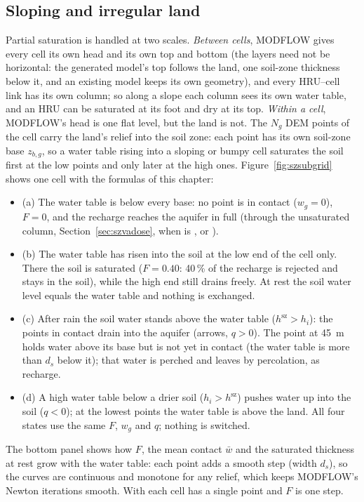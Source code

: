 \subsection{Sloping and irregular land}\label{sec:szslope}
Partial saturation is handled at two scales. \emph{Between cells}, MODFLOW gives every cell its own head and its own
top and bottom (the layers need not be horizontal: the generated model's top follows the land, one soil-zone thickness below it, and an existing model
keeps its own geometry), and every HRU--cell link has its own column; so along a slope each column sees its own water
table, and an HRU can be saturated at its foot and dry at its top. \emph{Within a cell}, MODFLOW's head is one flat
level, but the land is not. The $N_g$ DEM points of the cell carry the land's relief into the soil zone: each point has its
own soil-zone base $z_{b,g}$, so a water table rising into a sloping or bumpy cell saturates the soil first at the low
points and only later at the high ones. Figure~\ref{fig:szsubgrid} shows one cell with the formulas of this chapter:
\begin{itemize}
\item (a) The water table is below every base: no point is in contact ($w_g=0$), $F=0$, and the recharge reaches the
aquifer in full (through the unsaturated column, Section~\ref{sec:szvadose}, when  is ,  or ).
\item (b) The water table has risen into the soil at the low end of the cell only. There the soil is saturated
($F=0.40$: 40\,\% of the recharge is rejected and stays in the soil), while the high end still drains freely. At rest the
soil water level equals the water table and nothing is exchanged.
\item (c) After rain the soil water stands above the water table ($h^{\mathrm{sz}}>h_i$): the points in contact drain into the aquifer
(arrows, $q>0$). The point at 45~m holds water above its base but is not yet in contact (the water table is more than
$d_s$ below it); that water is perched and leaves by percolation, as recharge.
\item (d) A high water table below a drier soil ($h_i>h^{\mathrm{sz}}$) pushes water up into the soil ($q<0$); at the lowest points
the water table is above the land. All four states use the same $F$, $w_g$ and $q$; nothing is switched.
\end{itemize}
The bottom panel shows how $F$, the mean contact $\bar w$ and the saturated thickness at rest grow with the water table:
each point adds a smooth step (width $d_s$), so the curves are continuous and monotone for any relief, which keeps
MODFLOW's Newton iterations smooth. With  each cell has a single point and $F$ is one step.

